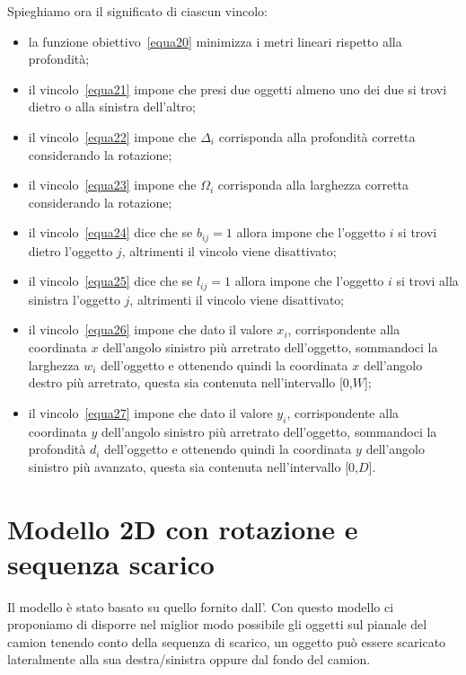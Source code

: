 Spieghiamo ora il significato di ciascun vincolo:
\begin{itemize}
	\item la funzione obiettivo~\eqref{equa20} minimizza i metri lineari rispetto alla profondità;
	\item il vincolo~\eqref{equa21} impone che presi due oggetti almeno uno dei due si trovi dietro o alla sinistra dell'altro;
	\item il vincolo~\eqref{equa22} impone che $\Delta_i$ corrisponda alla profondità corretta considerando la rotazione;
	\item il vincolo~\eqref{equa23} impone che $\Omega_i$ corrisponda alla larghezza corretta considerando la rotazione;
	\item il vincolo~\eqref{equa24} dice che se $b_{ij} = 1$ allora impone che l'oggetto $i$ si trovi dietro l'oggetto $j$, altrimenti il vincolo viene disattivato;
	\item il vincolo~\eqref{equa25} dice che se $l_{ij} = 1$ allora impone che l'oggetto $i$ si trovi alla sinistra l'oggetto $j$, altrimenti il vincolo viene disattivato;
	\item il vincolo~\eqref{equa26} impone che dato il valore $x_i$, corrispondente alla coordinata $x$ dell'angolo sinistro più arretrato dell'oggetto, sommandoci la larghezza $w_i$ dell'oggetto e ottenendo quindi la coordinata $x$ dell'angolo destro più arretrato, questa sia contenuta nell'intervallo [0,$W$];
	\item il vincolo~\eqref{equa27} impone che dato il valore $y_i$, corrispondente alla coordinata $y$ dell'angolo sinistro più arretrato dell'oggetto, sommandoci la profondità $d_i$ dell'oggetto e ottenendo quindi la coordinata $y$ dell'angolo sinistro più avanzato, questa sia contenuta nell'intervallo [0,$D$].
\end{itemize}

\newpage
\section{Modello 2D con rotazione e sequenza scarico}
Il modello è stato basato su quello fornito dall'.
Con questo modello ci proponiamo di disporre nel miglior modo possibile gli oggetti sul pianale del camion tenendo conto della sequenza di scarico, un oggetto può essere scaricato lateralmente alla sua destra/sinistra oppure dal fondo del camion.

